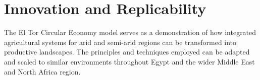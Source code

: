 \section{Innovation and Replicability}

The El Tor Circular Economy model serves as a demonstration of how integrated agricultural systems for arid and semi-arid regions can be transformed into productive landscapes. The principles and techniques employed can be adapted and scaled to similar environments throughout Egypt and the wider Middle East and North Africa region. 